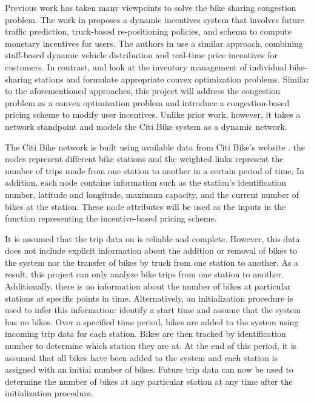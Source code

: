 \documentclass[times, 10pt,twocolumn]{article}
\begin{document}

Previous work has taken many viewpoints to solve the bike sharing congestion problem. The work in \cite{incentives} proposes a dynamic incentives system that involves future traffic prediction, truck-based re-positioning policies, and schema to compute monetary incentives for users. The authors in \cite{redistribution} use a similar approach, combining staff-based dynamic vehicle distribution and real-time price incentives for customers. In contrast, \cite{management} and \cite{redistribution} look at the inventory management of individual bike-sharing stations and formulate appropriate convex optimization problems. Similar to the aforementioned approaches, this project will address the congestion problem as a convex optimization problem and introduce a congestion-based pricing scheme to modify user incentives. Unlike prior work, however, it takes a network standpoint and models the Citi Bike system as a dynamic network.



The Citi Bike network is built using available data from Citi Bike's website \cite{dataset}. the nodes represent different bike stations and the weighted links represent the number of trips made from one station to another in a certain period of time. In addition, each node contains information such as the station's identification number, latitude and longitude, maximum capacity, and the current number of bikes at the station. These node attributes will be used as the inputs in the function representing the incentive-based pricing scheme.

It is assumed that the trip data on \cite{dataset} is reliable and complete. However, this data does not include explicit information about the addition or removal of bikes to the system nor the transfer of bikes by truck from one station to another. As a result, this project can only analyze bike trips from one station to another. Additionally, there is no information about the number of bikes at particular stations at specific points in time. Alternatively, an initialization procedure is used to infer this information: identify a start time and assume that the system has no bikes. Over a specified time period, bikes are added to the system using incoming trip data for each station. Bikes are then tracked by identification number to determine which station they are at. At the end of this period, it is assumed that all bikes have been added to the system and each station is assigned with an initial number of bikes. Future trip data can now be used to determine the number of bikes at any particular station at any time after the initialization procedure.
\end{document}
